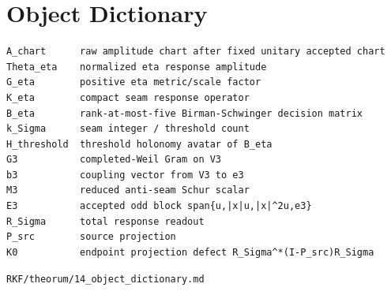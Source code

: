 \hypertarget{object-dictionary}{%
\chapter{Object Dictionary}\label{object-dictionary}}

\begin{verbatim}
A_chart      raw amplitude chart after fixed unitary accepted chart
Theta_eta    normalized eta response amplitude
G_eta        positive eta metric/scale factor
K_eta        compact seam response operator
B_eta        rank-at-most-five Birman-Schwinger decision matrix
k_Sigma      seam integer / threshold count
H_threshold  threshold holonomy avatar of B_eta
G3           completed-Weil Gram on V3
b3           coupling vector from V3 to e3
M3           reduced anti-seam Schur scalar
E3           accepted odd block span{u,|x|u,|x|^2u,e3}
R_Sigma      total response readout
P_src        source projection
K0           endpoint projection defect R_Sigma^*(I-P_src)R_Sigma
\end{verbatim}

\begin{flushright}\small\texttt{RKF/theorum/14\_object\_dictionary.md}\end{flushright}
